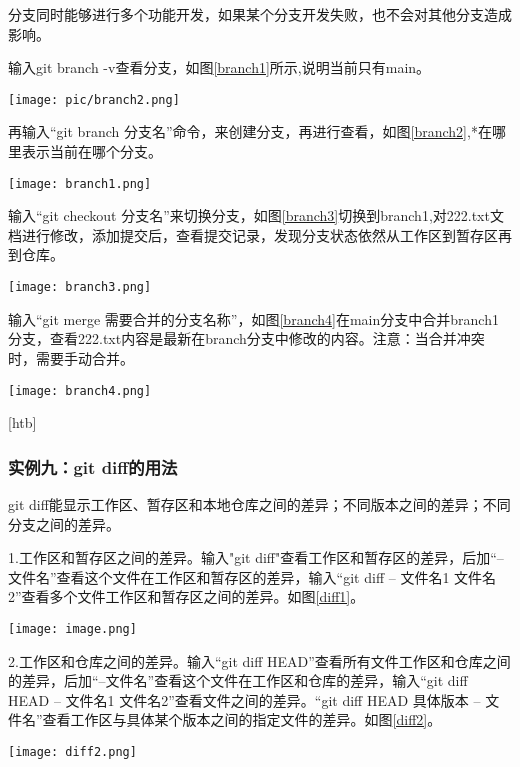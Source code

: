 \documentclass[a4paper]{article}
\begin{document}
分支同时能够进行多个功能开发，如果某个分支开发失败，也不会对其他分支造成影响。

输入git branch -v查看分支，如图\ref{branch1}所示,说明当前只有main。
\begin{figure*}[!htb]
    \centering
    \texttt{[image: pic/branch2.png]}
    \caption{git branch -v}
    \label{branch1}
\end{figure*}
再输入“git branch 分支名”命令，来创建分支，再进行查看，如图\ref{branch2},*在哪里表示当前在哪个分支。
\begin{figure*}[!htb]
    \centering
    \texttt{[image: branch1.png]}
    \caption{git branch}
    \label{branch2}
\end{figure*}

输入“git checkout 分支名”来切换分支，如图\ref{branch3}切换到branch1,对222.txt文档进行修改，添加提交后，查看提交记录，发现分支状态依然从工作区到暂存区再到仓库。
\begin{figure*}[!htb]
    \centering
    \texttt{[image: branch3.png]}
    \caption{branch checkout}
    \label{branch3}
\end{figure*}

输入“git merge 需要合并的分支名称”，如图\ref{branch4}在main分支中合并branch1分支，查看222.txt内容是最新在branch分支中修改的内容。注意：当合并冲突时，需要手动合并。
\begin{figure*}[!htb]
    \centering
    \texttt{[image: branch4.png]}
    \caption{branch merge}
    \label{branch4}
\end{figure*}[htb]

\vspace{1em}
 
\subsubsection{实例九：git diff的用法}
git diff能显示工作区、暂存区和本地仓库之间的差异；不同版本之间的差异；不同分支之间的差异。

1.工作区和暂存区之间的差异。输入"git diff"查看工作区和暂存区的差异，后加“--文件名”查看这个文件在工作区和暂存区的差异，输入“git diff -- 文件名1 文件名2”查看多个文件工作区和暂存区之间的差异。如图\ref{diff1}。
\begin{figure*}[!htb]
    \centering
    \texttt{[image: image.png]}
    \caption{git diff1}
    \label{diff1}
\end{figure*}

2.工作区和仓库之间的差异。输入“git diff HEAD”查看所有文件工作区和仓库之间的差异，后加“--文件名”查看这个文件在工作区和仓库的差异，输入“git diff HEAD -- 文件名1 文件名2”查看文件之间的差异。“git diff HEAD 具体版本 -- 文件名”查看工作区与具体某个版本之间的指定文件的差异。如图\ref{diff2}。
\begin{figure*}[!htb]
    \centering
    \texttt{[image: diff2.png]}
    \caption{git diff2}
    \label{diff2}
\end{figure*}
\end{document}
